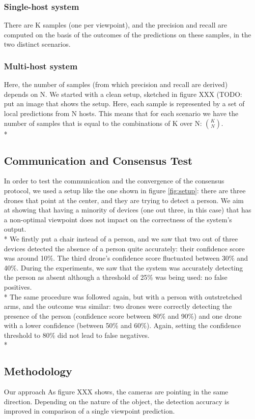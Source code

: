 \documentclass[10pt,conference,compsocconf]{IEEEtran}
\begin{document}
\subsubsection{Single-host system}There are K samples (one per viewpoint), and the precision and recall are computed on the basis of the outcomes of the predictions on these samples, in the two distinct scenarios.
\subsubsection{Multi-host system}
Here, the number of samples (from which precision and recall are derived) depends on N.
We started with a clean setup, sketched in figure XXX (TODO: put an image that shows the setup.
Here, each sample is represented by a set of local predictions from N hosts. This means that for each scenario we have the number of samples that is equal to the combinations of K over N: $\binom{K}{N}$.\\*

\subsection{Communication and Consensus Test}
In order to test the communication and the convergence of the consensus protocol, we used a setup like the one shown in figure \ref{fig:setup}: there are three drones that point at the center, and they are trying to detect a person. We aim at showing that having a minority of devices (one out three, in this case) that has a non-optimal viewpoint does not impact on the correctness of the system's output.\\*
We firstly put a chair instead of a person, and we saw that two out of three devices detected the absence of a person quite accurately: their confidence score was around 10\%. The third drone's confidence score fluctuated between 30\% and 40\%. During the experiments, we saw that the system was accurately detecting the person as absent although a threshold of 25\% was being used: no false positives.\\*
The same procedure was followed again, but with a person with outstretched arms, and the outcome was similar: two drones were correctly detecting the presence of the person (confidence score between 80\% and 90\%) and one drone with a lower confidence (between 50\% and 60\%). Again, setting the confidence threshold to 80\% did not lead to false negatives.\\*
\subsection{Methodology}
Our approach 
As figure XXX shows, the cameras are pointing in the same direction. Depending on the nature of the object, the detection accuracy is improved in comparison of a single viewpoint prediction. 
\end{document}
